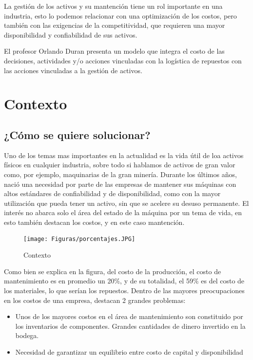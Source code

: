 \documentclass[]{article}
\begin{document}
La gestión de los activos y su mantención tiene un rol importante en una industria, esto lo podemos relacionar con una optimización de los costos, pero también con las exigencias de la competitividad, que requieren una mayor disponibilidad y confiabilidad de sus activos.


El profesor Orlando Duran presenta un modelo que integra el costo de las decisiones, actividades y/o acciones vinculadas con la logística de repuestos con las acciones vinculadas a la gestión de activos.



\hypertarget{Contexto}{
\section{Contexto }
\label{Contexto}}

\subsection{¿Cómo se quiere solucionar?}
Uno de los temas mas importantes en la actualidad es la vida útil de loa activos físicos en cualquier industria, sobre todo si hablamos de activos de gran valor como, por ejemplo, maquinarias de la gran minería.
Durante los últimos años, nació una necesidad por parte de las empresas de mantener sus máquinas con altos estándares de confiabilidad y de disponibilidad, como con la mayor utilización que pueda tener un activo, sin que se acelere su desuso permanente. 
El interés no abarca solo el área del estado de la máquina por un tema de vida, en esto también destacan los costos, y en este caso mantención.

\begin{figure}[!h]
    \centering
    \texttt{[image: Figuras/porcentajes.JPG]}
    \caption{Contexto}
    \label{fig:my_label}
\end{figure}
Como bien se explica en la figura, del costo de la producción, el costo de mantenimiento es en promedio un 20$\%$, y de su totalidad, el 59$\%$ es del costo de los materiales, lo que serían los repuestos. 
Dentro de las mayores preocupaciones en los costos de una empresa, destacan 2 grandes problemas:

\begin{itemize}
    \item 	Unos de los mayores costos en el área de mantenimiento son constituido por los inventarios de componentes.
Grandes cantidades de dinero invertido en la bodega.
    \item 	Necesidad de garantizar un equilibrio entre costo de capital y disponibilidad
\end{itemize}
\end{document}
